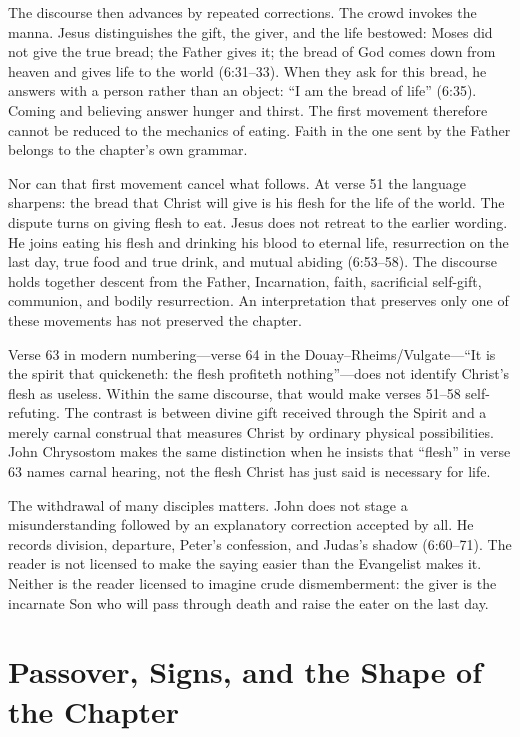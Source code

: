 \begin{deepstudy}
The discourse then advances by repeated corrections. The crowd invokes the
manna. Jesus distinguishes the gift, the giver, and the life bestowed: Moses
did not give the true bread; the Father gives it; the bread of God comes down
from heaven and gives life to the world (6:31--33). When they ask for this
bread, he answers with a person rather than an object: ``I am the bread of
life'' (6:35). Coming and believing answer hunger and thirst. The first movement
therefore cannot be reduced to the mechanics of eating. Faith in the one sent
by the Father belongs to the chapter's own grammar.

Nor can that first movement cancel what follows. At verse 51 the language
sharpens: the bread that Christ will give is his flesh for the life of the
world. The dispute turns on giving flesh to eat. Jesus does not retreat to the
earlier wording. He joins eating his flesh and drinking his blood to eternal
life, resurrection on the last day, true food and true drink, and mutual
abiding (6:53--58). The discourse holds together descent from the Father,
Incarnation, faith, sacrificial self-gift, communion, and bodily resurrection.
An interpretation that preserves only one of these movements has not preserved
the chapter.

Verse 63 in modern numbering---verse 64 in the
Douay--Rheims/Vulgate---``It is the spirit that quickeneth: the flesh profiteth
nothing''---does not identify Christ's flesh as useless. Within the same
discourse, that would make verses 51--58 self-refuting. The contrast is between
divine gift received through the Spirit and a merely carnal construal that
measures Christ by ordinary physical possibilities. John Chrysostom makes the
same distinction when he insists that ``flesh'' in verse 63 names carnal
hearing, not the flesh Christ has just said is necessary for life.

The withdrawal of many disciples matters. John does not stage a misunderstanding
followed by an explanatory correction accepted by all. He records division,
departure, Peter's confession, and Judas's shadow (6:60--71). The reader is not
licensed to make the saying easier than the Evangelist makes it. Neither is the
reader licensed to imagine crude dismemberment: the giver is the incarnate Son
who will pass through death and raise the eater on the last day.

\section{Passover, Signs, and the Shape of the Chapter}


\end{deepstudy}
